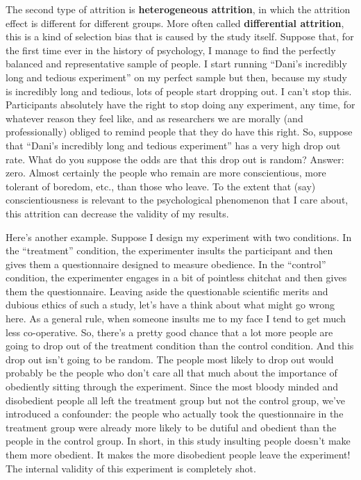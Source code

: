 \documentclass[
  a4paper,
]{book}
\begin{document}
The second type of attrition is \textbf{heterogeneous attrition}, in
which the attrition effect is different for different groups. More often
called \textbf{differential attrition}, this is a kind of selection bias
that is caused by the study itself. Suppose that, for the first time
ever in the history of psychology, I manage to find the perfectly
balanced and representative sample of people. I start running ``Dani's
incredibly long and tedious experiment'' on my perfect sample but then,
because my study is incredibly long and tedious, lots of people start
dropping out. I can't stop this. Participants absolutely have the right
to stop doing any experiment, any time, for whatever reason they feel
like, and as researchers we are morally (and professionally) obliged to
remind people that they do have this right. So, suppose that ``Dani's
incredibly long and tedious experiment'' has a very high drop out rate.
What do you suppose the odds are that this drop out is random? Answer:
zero. Almost certainly the people who remain are more conscientious,
more tolerant of boredom, etc., than those who leave. To the extent that
(say) conscientiousness is relevant to the psychological phenomenon that
I care about, this attrition can decrease the validity of my results.

Here's another example. Suppose I design my experiment with two
conditions. In the ``treatment'' condition, the experimenter insults the
participant and then gives them a questionnaire designed to measure
obedience. In the ``control'' condition, the experimenter engages in a
bit of pointless chitchat and then gives them the questionnaire. Leaving
aside the questionable scientific merits and dubious ethics of such a
study, let's have a think about what might go wrong here. As a general
rule, when someone insults me to my face I tend to get much less
co-operative. So, there's a pretty good chance that a lot more people
are going to drop out of the treatment condition than the control
condition. And this drop out isn't going to be random. The people most
likely to drop out would probably be the people who don't care all that
much about the importance of obediently sitting through the experiment.
Since the most bloody minded and disobedient people all left the
treatment group but not the control group, we've introduced a
confounder: the people who actually took the questionnaire in the
treatment group were already more likely to be dutiful and obedient than
the people in the control group. In short, in this study insulting
people doesn't make them more obedient. It makes the more disobedient
people leave the experiment! The internal validity of this experiment is
completely shot.
\end{document}
